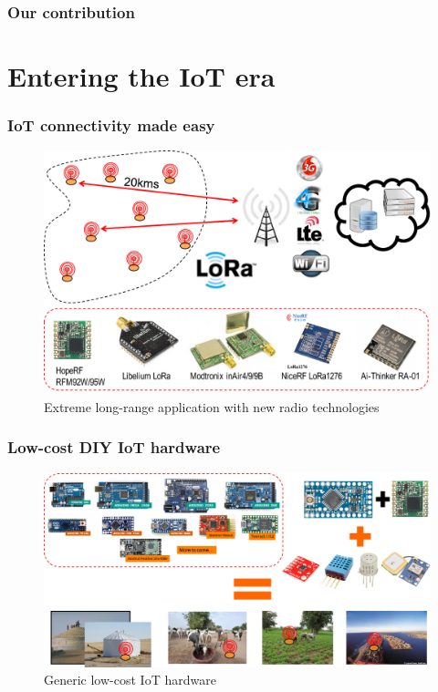 \documentclass{beamer}
\begin{document}
\begin{frame}
\frametitle{Our contribution}
  

\end{frame}

\section{Entering the IoT era}

\begin{frame}
\frametitle{IoT connectivity made easy}
 
\begin{figure}[H]  
\centering  
\includegraphics[width=.55\linewidth]{figures/1-hop}   
\caption{Extreme long-range application with new radio technologies}   
\label{figure-1hop}  
\end{figure} 
\end{frame}

\begin{frame}
\frametitle{Low-cost DIY IoT hardware}
 
  \begin{figure}[H]  
  \centering  
  \includegraphics[width=.7\linewidth]{figures/generic-iot}   
  \caption{Generic low-cost IoT hardware}   
  \label{figure-generic-iot}  
  \end{figure} 

\end{frame}
\end{document}
